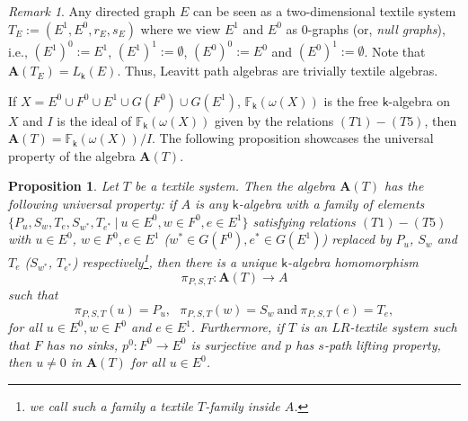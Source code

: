 \documentclass[a4paper,reqno,12pt]{amsart}
\newtheorem{prop}[thm]{Proposition}
\theoremstyle{definition}
\theoremstyle{remark}
\newtheorem{rmk}[thm]{Remark}
\begin{document}
\begin{rmk}\label{rem LPA as A(T)}
Any directed graph $E$ can be seen as a two-dimensional textile system $T_E:=(E^1,E^0,r_E,s_E)$ where we view $E^1$ and $E^0$ as $0$-graphs (or, \emph{null graphs}), i.e., $(E^1)^0:=E^1$, $(E^1)^1:=\emptyset$, $(E^0)^0:=E^0$ and $(E^0)^1:=\emptyset$. Note that $\mathbf{A}(T_E)=L_\mathsf{k}(E)$. Thus, Leavitt path algebras are trivially textile algebras.     
\end{rmk}
If $X=E^0\cup F^0\cup E^1\cup G(F^0)\cup G(E^1)$, $\mathbb{F}_\mathsf{k}(\omega(X))$ is the free $\mathsf{k}$-algebra on $X$ and $I$ is the ideal of $\mathbb{F}_\mathsf{k}(\omega(X))$ given by the relations $(T1)-(T5)$, then $\mathbf{A}(T)=\mathbb{F}_\mathsf{k}(\omega(X))/I$. The following proposition showcases the universal property of the algebra $\mathbf{A}(T)$.
\begin{prop}\label{pro universal property of the algebra}
Let $T$ be a textile system. Then the algebra $\mathbf{A}(T)$ has the following universal property: if $A$ is any $\mathsf{k}$-algebra with a family of elements $\{P_u,S_w,T_e,S_{w^*},T_{e^*}~|~u\in E^0,w\in F^0,e\in E^1\}$ satisfying relations $(T1)-(T5)$ with $u\in E^0$, $w\in F^0,e\in E^1$ ($w^*\in G(F^0),e^*\in G(E^1)$) replaced by $P_u$, $S_w$ and $T_e$ ($S_{w^*}$, $T_{e^*}$) respectively\footnote{we call such a family a \emph{textile $T$-family} inside $A$.}, then there is a unique $\mathsf{k}$-algebra homomorphism \[\pi_{P,S,T}:\mathbf{A}(T)\longrightarrow A\] such that \[\pi_{P,S,T}(u)=P_u,~~~\pi_{P,S,T}(w)=S_w~\text{and}~\pi_{P,S,T}(e)=T_e,\] for all $u\in E^0,w\in F^0$ and $e\in E^1$. Furthermore, if $T$ is an $LR$-textile system such that $F$ has no sinks, $p^0:F^0\longrightarrow E^0$ is surjective and $p$ has $s$-path lifting property, then $u\neq 0$ in $\mathbf{A}(T)$ for all $u\in E^0$. 
\end{prop}
\end{document}
